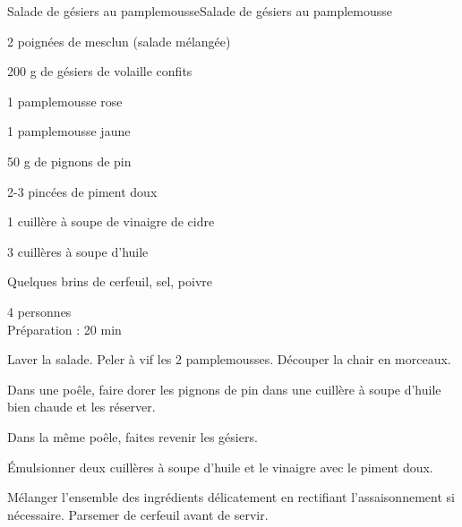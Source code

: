 \begin{recette}{Salade de gésiers au pamplemousse}{Salade de gésiers au pamplemousse}

\begin{ingredients}
 2 poignées de mesclun (salade mélangée)\par
 200 g de gésiers de volaille confits\par
 1 pamplemousse rose\par
 1 pamplemousse jaune\par
 50 g de pignons de pin\par
 2-3 pincées de piment doux\par
 1 cuillère à soupe de vinaigre de cidre\par
 3 cuillères à soupe d'huile\par
 Quelques brins de cerfeuil, sel, poivre
\end{ingredients}
\begin{infos}
  4 personnes	\\	%
 Préparation : 20 min		%
\end{infos}
\begin{etapes}
\item Laver la salade. Peler à vif les 2 pamplemousses. Découper la chair en morceaux.
\item Dans une poêle, faire dorer les pignons de pin dans une cuillère à soupe d'huile bien chaude et les réserver.
\item Dans la même poêle, faites revenir les gésiers.
\item Émulsionner deux cuillères à soupe d'huile et le vinaigre avec le piment doux.
\item Mélanger l'ensemble des ingrédients délicatement en rectifiant l'assaisonnement si nécessaire. Parsemer de cerfeuil avant de servir.
\end{etapes}

\end{recette}